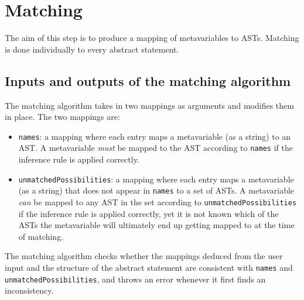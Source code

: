 \section{Matching}
\label{checking:matching}
The aim of this step is to produce a mapping of metavariables to ASTs. Matching is done individually to every abstract statement.

\subsection{Inputs and outputs of the matching algorithm}
The matching algorithm takes in two mappings as arguments and modifies them in place. The two mappings are:
\begin{itemize}
    \item \lstinline{names}: a mapping where each entry maps a metavariable (as a string) to an AST. A metavariable \textit{must} be mapped to the AST according to \lstinline{names} if the inference rule is applied correctly.
    \item \lstinline{unmatchedPossibilities}: a mapping where each entry maps a metavariable (as a string) that does not appear in \lstinline{names} to a set of ASTs. A metavariable \textit{can} be mapped to any AST in the set according to \lstinline{unmatchedPossibilities} if the inference rule is applied correctly, yet it is not known which of the ASTs the metavariable will ultimately end up getting mapped to at the time of matching.
\end{itemize}
The matching algorithm checks whether the mappings deduced from the user input and the structure of the abstract statement are consistent with \lstinline{names} and \lstinline{unmatchedPossibilities}, and throws an error whenever it first finds an inconsistency.

